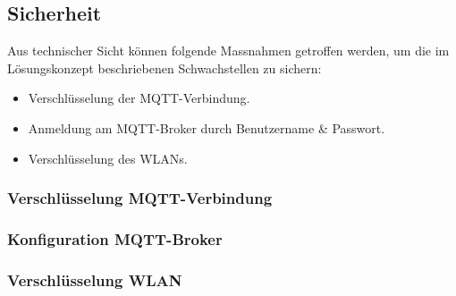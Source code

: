 \subsection{Sicherheit}
Aus technischer Sicht können folgende Massnahmen getroffen werden, um die im Lösungskonzept beschriebenen Schwachstellen zu sichern:
\begin{itemize}
	\item Verschlüsselung der MQTT-Verbindung.
	\item Anmeldung am MQTT-Broker durch Benutzername \& Passwort.
	\item Verschlüsselung des WLANs.
\end{itemize}

\subsubsection{Verschlüsselung MQTT-Verbindung}


\subsubsection{Konfiguration MQTT-Broker}

\subsubsection{Verschlüsselung WLAN}






